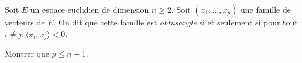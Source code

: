 \begin{tcolorbox}
    Soit $E$ un espace euclidien de dimension $n \geqslant 2$. Soit $(x_1, \dots, x_p)$ une famille de vecteurs de $E$. On dit que cette famille est \emph{obtusangle} si et seulement si pour tout $i \not= j, \langle x_i, x_j \rangle < 0$. 
\end{tcolorbox}

Montrer que $p \leqslant n + 1$. 
